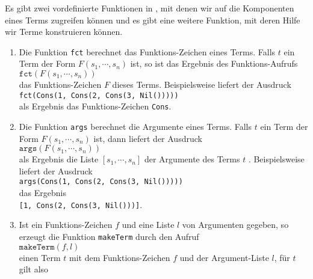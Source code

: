 Es gibt zwei vordefinierte Funktionen in \setl, mit denen wir auf die Komponenten eines Terms
zugreifen können und es gibt eine weitere Funktion, mit deren Hilfe wir Terme konstruieren können.
\begin{enumerate}
\item Die Funktion \texttt{fct} berechnet das Funktions-Zeichen eines Terms.
      Falls $t$ ein Term der Form $F(s_1,\cdots,s_n)$ ist, so ist das Ergebnis des Funktions-Aufrufs
      \\[0.2cm]
      \hspace*{1.3cm}
      $\texttt{fct}(F(s_1,\cdots,s_n))$
      \\[0.2cm]
      das Funktions-Zeichen $F$ dieses Terms.  Beispielsweise liefert der Ausdruck
      \\[0.2cm]
      \hspace*{1.3cm}
      \texttt{fct(Cons(1, Cons(2, Cons(3, Nil()))))}
      \\[0.2cm]
      als Ergebnis das Funktions-Zeichen \texttt{Cons}.
\item Die Funktion \texttt{args} berechnet die Argumente eines Terms.
      Falls $t$ ein Term der Form $F(s_1,\cdots,s_n)$ ist, dann liefert der Ausdruck
      \\[0.2cm]
      \hspace*{1.3cm}
      $\mathtt{args}(F(s_1,\cdots,s_n))$
      \\[0.2cm]
      als Ergebnis die Liste $[s_1, \cdots, s_n]$ der Argumente des Terms $t$  .  Beispielsweise
      liefert der Ausdruck
      \\[0.2cm]
      \hspace*{1.3cm}
      \texttt{args(Cons(1, Cons(2, Cons(3, Nil()))))}
      \\[0.2cm]
      das Ergebnis
      \\[0.2cm]
      \hspace*{1.3cm}
      \texttt{[1, Cons(2, Cons(3, Nil()))]}.
\item Ist ein Funktions-Zeichen $f$ und eine Liste $l$ von Argumenten gegeben, so erzeugt die
      Funktion \texttt{makeTerm} durch den Aufruf
      \\[0.2cm]
      \hspace*{1.3cm}
      $\texttt{makeTerm}(f,l)$
      \\[0.2cm]
      einen Term $t$ mit dem Funktions-Zeichen $f$ und der Argument-Liste $l$, für $t$ gilt also
      \\[0.2cm]
      \hspace*{1.3cm}

\end{enumerate}
